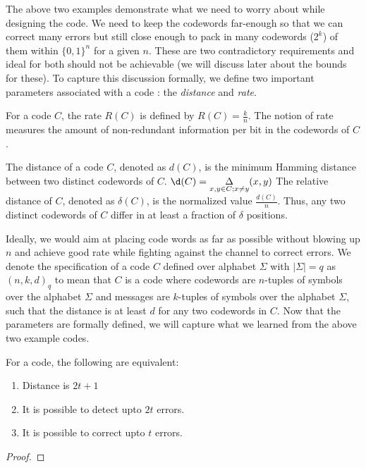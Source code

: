 The above two examples demonstrate what we need to worry about while designing the code. We need to keep the codewords far-enough so that we can correct many errors but still close enough to pack in many codewords ($2^k$) of them within $\{0,1\}^n$ for a given $n$. These are two contradictory requirements and ideal for both should not be achievable (we will discuss later about the bounds for these). To capture this discussion formally, we define two important parameters associated with a code : the \emph{distance} and \emph{rate}.

\begin{definition}
For a code $C$, the rate $R(C)$ is defined by
$R(C)=\frac{k}{n}$. The notion of rate measures the amount of non-redundant information per bit in the codewords of $C$.
\end{definition}
\begin{definition}
The distance of a code $C$, denoted as $d(C)$, is the minimum Hamming distance between two distinct codewords of $C$.
$\d(C)=\underset{x,y \in C; x \neq y} \Delta(x,y)$
The relative distance of $C$, denoted as $\delta(C)$, is the normalized value $\frac{d(C)}{n}$. Thus, any two distinct codewords of $C$ differ in at least a fraction of $\delta$ positions.
\end{definition}

Ideally, we would aim at placing code words as far as possible without blowing up $n$ and achieve good rate while fighting against the channel to correct errors. We denote the specification of a code $C$ defined over alphabet $\Sigma$ with $|\Sigma|=q$ as $(n,k,d)_q$ to mean that $C$ is a code where codewords are $n$-tuples of symbols over the alphabet $\Sigma$ and messages are $k$-tuples of symbols over the alphabet $\Sigma$, such that the distance is at least $d$ for any two codewords in $C$. Now that the parameters are formally defined, we will capture what we learned from the above two example codes.

\begin{lemma}
For a code, the following are equivalent:
\begin{enumerate}
\item Distance is $2t+1$
\item It is possible to detect upto $2t$ errors.
\item It is possible to correct upto $t$ errors.
\end{enumerate}
\end{lemma}
\begin{proof}
\end{proof}

